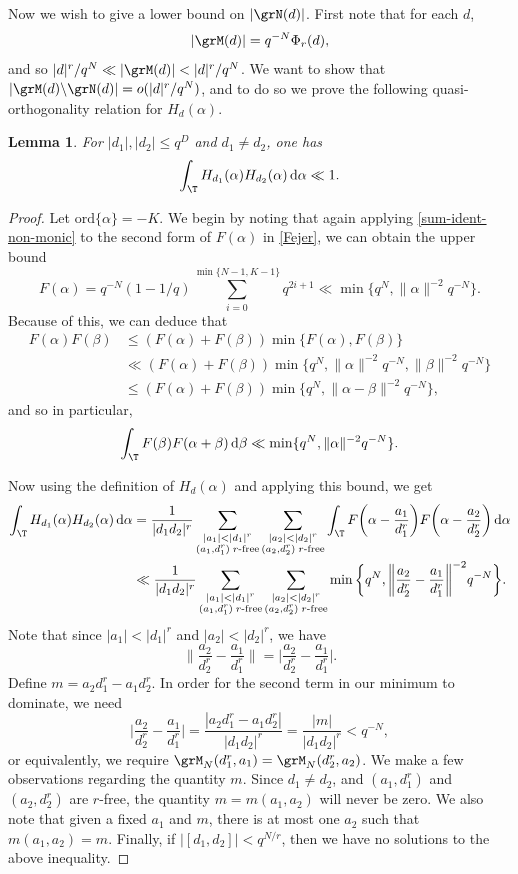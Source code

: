 \documentclass[reqno,11pt]{amsart}
\newtheorem{lemma}[theorem]{Lemma}
\theoremstyle{definition}
\theoremstyle{remark}
\numberwithin{equation}{section}
\def\setmin{{\setminus\!\,}}
\newcommand{\ord}{\text{ord}}
\renewcommand{\d}{\,{\rm d}} %
\newcommand{\<}{\begin{equation}}
\renewcommand{\>}{\end{equation}}
\begin{document}
Now we wish to give a lower bound on $|\grN(d)|$. First note that for each $d$,
\[|\grM(d)| = q^{-N}\Phi_r(d),\]
and so $|d|^r/q^N \ll |\grM(d)| < |d|^r/q^N$. We want to show that $|\grM(d) \setmin \grN(d)| = o(|d|^r/q^N)$, and to do so we prove the following quasi-orthogonality relation for $H_d(\alpha)$.
\begin{lemma}
    For $|d_1|,|d_2|\leq q^D$ and $d_1 \neq d_2$, one has
    \[\int_\T H_{d_1}(\alpha)H_{d_2}(\alpha)\d\alpha \ll 1.\]
\end{lemma}
\begin{proof}
    Let $\ord\{\alpha\} = -K$. We begin by noting that again applying \eqref{sum-ident-non-monic} to the second form of $F(\alpha)$ in \eqref{Fejer}, we can obtain the upper bound
    \[F(\alpha) = q^{-N}(1-1/q)\sum_{i=0}^{\min\{N-1,K-1\}}q^{2i+1} \ll \min\{q^N,\|\alpha\|^{-2}q^{-N}\}.\]
    Because of this, we can deduce that
    \begin{align*}
        F(\alpha)F(\beta) &\leq (F(\alpha)+F(\beta))\min\{F(\alpha),F(\beta)\} \\
        &\ll (F(\alpha)+F(\beta))\min\{q^N,\|\alpha\|^{-2}q^{-N},\|\beta\|^{-2}q^{-N}\} \\
        &\leq (F(\alpha)+F(\beta))\min\{q^N,\|\alpha - \beta\|^{-2}q^{-N}\},
    \end{align*}
    and so in particular,
    \[\int_\T F(\beta)F(\alpha+\beta)\d\beta \ll \min\{q^N,\|\alpha\|^{-2}q^{-N}\}.\]
    
    Now using the definition of $H_d(\alpha)$ and applying this bound, we get
    \begin{align*}
        \int_\T H_{d_1}(\alpha)H_{d_2}(\alpha)\d\alpha &= \dfrac{1}{|d_1d_2|^r} \sum_{\substack{|a_1| < |d_1|^r \\ (a_1,d_1^r)\;r\text{-free}}} \sum_{\substack{|a_2| < |d_2|^r \\ (a_2,d_2^r)\; r\text{-free}}}\int_\T F\bigg(\alpha - \dfrac{a_1}{d_1^r}\bigg)F\bigg(\alpha - \dfrac{a_2}{d_2^r}\bigg)\d \alpha \\
        &\ll \dfrac{1}{|d_1d_2|^r} \sum_{\substack{|a_1| < |d_1|^r \\ (a_1,d_1^r)\;r\text{-free}}} \sum_{\substack{|a_2| < |d_2|^r \\ (a_2,d_2^r)\; r\text{-free}}} \min\bigg\{q^N, \bigg\|\dfrac{a_2}{d_2^r}-\dfrac{a_1}{d_1^r}\bigg\|^{-2}q^{-N}\bigg\}.
    \end{align*}
    Note that since $|a_1|<|d_1|^r$ and $|a_2|<|d_2|^r$, we have
    \[\bigg\|\dfrac{a_2}{d_2^r}-\dfrac{a_1}{d_1^r}\bigg\| = \bigg|\dfrac{a_2}{d_2^r}-\dfrac{a_1}{d_1^r}\bigg|.\]
    Define $m = a_2d_1^r - a_1d_2^r$. In order for the second term in our minimum to dominate, we need
    \[\bigg|\dfrac{a_2}{d_2^r}-\dfrac{a_1}{d_1^r}\bigg| = \dfrac{|a_2d_1^r-a_1d_2^r|}{|d_1d_2|^r} = \dfrac{|m|}{|d_1d_2|^r} < q^{-N},\]
    or equivalently, we require $\grM_N(d_1^r,a_1) = \grM_N(d_2^r,a_2)$. We make a few observations regarding the quantity $m$. Since $d_1 \neq d_2$, and $(a_1,d_1^r)$ and $(a_2,d_2^r)$ are $r$-free, the quantity $m = m(a_1,a_2)$ will never be zero. We also note that given a fixed $a_1$ and $m$, there is at most one $a_2$ such that $m(a_1,a_2) = m$. Finally, if $|[d_1,d_2]|<q^{N/r}$, then we have no solutions to the above inequality. 
    

\end{proof}
\end{document}

